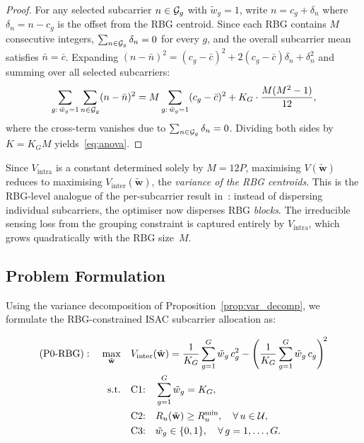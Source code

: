 \begin{proof}
For any selected subcarrier $n \in \mathcal{G}_g$ with $\tilde{w}_g = 1$, write $n = c_g + \delta_n$ where $\delta_n = n - c_g$ is the offset from the RBG centroid.
Since each RBG contains $M$ consecutive integers, $\sum_{n \in \mathcal{G}_g} \delta_n = 0$ for every $g$, and the overall subcarrier mean satisfies $\bar{n} = \bar{c}$.
Expanding $(n - \bar{n})^2 = (c_g - \bar{c})^2 + 2(c_g - \bar{c})\delta_n + \delta_n^2$ and summing over all selected subcarriers:
\begin{equation}
  \sum_{g:\,\tilde{w}_g=1} \sum_{n \in \mathcal{G}_g} (n - \bar{n})^2
  = M \sum_{g:\,\tilde{w}_g=1} (c_g - \bar{c})^2
    + K_G \cdot \frac{M(M^2 - 1)}{12},
  \label{eq:decomp_expand}
\end{equation}
where the cross-term vanishes due to $\sum_{n \in \mathcal{G}_g} \delta_n = 0$.
Dividing both sides by $K = K_G M$ yields~\eqref{eq:anova}.
\end{proof}

\begin{remark}
\label{rmk:opt_implication}
Since $V_{\mathrm{intra}}$ is a constant determined solely by $M = 12P$, maximising $V(\tilde{\mathbf{w}})$ reduces to maximising $V_{\mathrm{inter}}(\tilde{\mathbf{w}})$, the \emph{variance of the RBG centroids}.
This is the RBG-level analogue of the per-subcarrier result in~\cite{ldsa}:
instead of dispersing individual subcarriers, the optimiser now disperses RBG \emph{blocks}.
The irreducible sensing loss from the grouping constraint is captured entirely by $V_{\mathrm{intra}}$, which grows quadratically with the RBG size~$M$.
\end{remark}

\subsection{Problem Formulation}
\label{subsec:problem}

Using the variance decomposition of Proposition~\ref{prop:var_decomp}, we formulate the RBG-constrained ISAC subcarrier allocation as:

\begin{subequations}\label{eq:P0_RBG}
\begin{align}
  (\text{P0-RBG}): \quad \max_{\tilde{\mathbf{w}}} \quad
    & V_{\mathrm{inter}}(\tilde{\mathbf{w}})
    = \frac{1}{K_G}\sum_{g=1}^{G} \tilde{w}_g\, c_g^2
      - \left(\frac{1}{K_G}\sum_{g=1}^{G} \tilde{w}_g\, c_g\right)^{\!2}
    \label{eq:P0_obj} \\
  \text{s.t.} \quad
    & \text{C1:} \quad \sum_{g=1}^{G} \tilde{w}_g = K_G,
    \label{eq:P0_C1} \\
    & \text{C2:} \quad R_u(\tilde{\mathbf{w}}) \geq R^{\min}_u, \quad \forall\, u \in \mathcal{U},
    \label{eq:P0_C2} \\
    & \text{C3:} \quad \tilde{w}_g \in \{0, 1\}, \quad \forall\, g = 1, \ldots, G.
    \label{eq:P0_C3}
\end{align}
\end{subequations}

